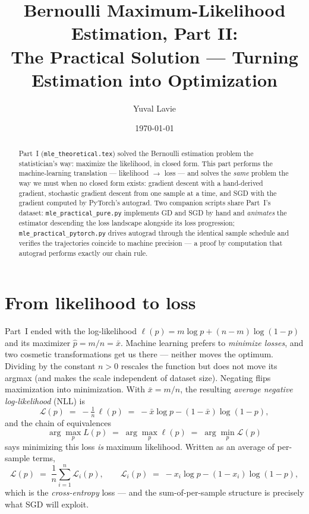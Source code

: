 \documentclass[11pt]{article}
\title{Bernoulli Maximum-Likelihood Estimation, Part II:\\
The Practical Solution --- Turning Estimation into Optimization}
\author{Yuval Lavie}
\date{\today}
\newcommand{\xbar}{\bar{x}}
\begin{document}
\maketitle

\begin{abstract}
Part~I (\texttt{mle\_theoretical.tex}) solved the Bernoulli estimation
problem the statistician's way: maximize the likelihood, in closed form.
This part performs the machine-learning translation --- likelihood
$\to$ loss --- and solves the \emph{same} problem the way we must when no
closed form exists: gradient descent with a hand-derived gradient,
stochastic gradient descent from one sample at a time, and SGD with the
gradient computed by PyTorch's autograd. Two companion scripts share
Part~I's dataset: \texttt{mle\_practical\_pure.py} implements GD and SGD
by hand and \emph{animates} the estimator descending the loss landscape
alongside its loss progression; \texttt{mle\_practical\_pytorch.py}
drives autograd through the identical sample schedule and verifies the
trajectories coincide to machine precision --- a proof by computation
that autograd performs exactly our chain rule.
\end{abstract}

\section{From likelihood to loss}

Part~I ended with the log-likelihood
$\ell(p) = m\log p + (n-m)\log(1-p)$ and its maximizer
$\hat{p} = m/n = \xbar$. Machine learning prefers to \emph{minimize
losses}, and two cosmetic transformations get us there --- neither moves
the optimum. Dividing by the constant $n > 0$ rescales the function but
does not move its argmax (and makes the scale independent of dataset
size). Negating flips maximization into minimization. With
$\xbar = m/n$, the resulting \emph{average negative log-likelihood}
(NLL) is
\begin{equation}
  \mathcal{L}(p) \;=\; -\tfrac1n\,\ell(p)
  \;=\; -\xbar\log p - (1-\xbar)\log(1-p),
  \label{eq:nll}
\end{equation}
and the chain of equivalences
\begin{equation}
  \arg\max_p L(p)
  \;=\; \arg\max_p \ell(p)
  \;=\; \arg\min_p \mathcal{L}(p)
  \label{eq:equiv}
\end{equation}
says minimizing this loss \emph{is} maximum likelihood. Written as an
average of per-sample terms,
\begin{equation}
  \mathcal{L}(p) \;=\; \frac1n \sum_{i=1}^{n} \mathcal{L}_i(p),
  \qquad
  \mathcal{L}_i(p) \;=\; -x_i \log p - (1-x_i)\log(1-p),
  \label{eq:persample}
\end{equation}
which is the \emph{cross-entropy} loss --- and the sum-of-per-sample
structure is precisely what SGD will exploit.
\end{document}
